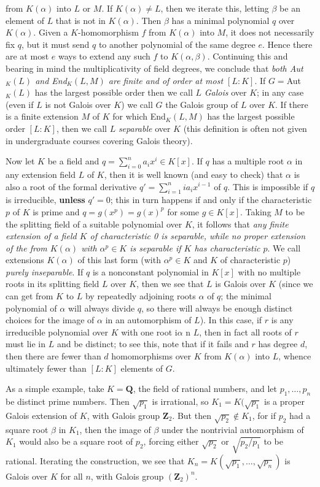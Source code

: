 \documentclass[10pt]{article}
\begin{document}
from $K(\alpha)$ into $L$ or $M$. If $K(\alpha)\ne L$, then we iterate
this, letting $\beta$ be an element of $L$ that is not in $K(\alpha)$.
Then $\beta$ has a minimal polynomial $q$ over $K(\alpha)$. Given a
$K$-homomorphism $f$ from $K(\alpha)$ into $M$, it does not necessarily
fix $q$, but it must send $q$ to another polynomial of the same degree
$e$. Hence there are at most $e$ ways to extend any such $f$ to
$K(\alpha,\beta)$. Continuing this and bearing in mind the
multiplicativity of field degrees, we conclude that {\sl both Aut$_K(L)$
  and End$_K(L,M)$ are finite and of order at most $[L:K]$}. If
$G=$Aut$_K(L)$ has the largest possible order then we call $L$ {\sl
  Galois} over $K$; in any case (even if $L$ is not Galois over $K$) we
call $G$ the Galois group of $L$ over $K$. If there is a finite
extension $M$ of $K$ for which End$_K(L,M)$ has the largest possible
order $[L:K]$, then we call $L$ {\sl separable} over $K$ (this
definition is often not given in undergraduate courses covering Galois
theory).

Now let $K$ be a field and $q=\sum_{i=0}^n a_i x^i \in K[x]$. If $q$ has
a multiple root $\alpha$ in any extension field $L$ of $K$, then it is
well known (and easy to check) that $\alpha$ is also a root of the
formal derivative $q' = \sum_{i=1}^n ia_i x^{i-1}$ of $q$. This is
impossible if $q$ is irreducible, \textbf{unless} $q' = 0$; this in turn
happens if and only if the characteristic $p$ of $K$ is prime and $q =
g(x^p) = g(x)^p$ for some $g\in K[x]$. Taking $M$ to be the splitting
field of a suitable polynomial over $K$, it follows that {\sl any finite
  extension of a field $K$ of characteristic 0 is separable, while no
  proper extension of the from $K(\alpha)$ with $\alpha^p\in K$ is
  separable if $K$ has characteristic $p$}. We call extensions
$K(\alpha)$ of this last form (with $\alpha^p\in K$ and $K$ of
characteristic $p$) {\sl purely inseparable}. If $q$ is a nonconstant
polynomial in $K[x]$ with no multiple roots in its splitting field $L$
over $K$, then we see that $L$ is Galois over $K$ (since we can get from
$K$ to $L$ by repeatedly adjoining roots $\alpha$ of $q$; the minimal
polynomial of $\alpha$ will always divide $q$, so there will always be
enough distinct choices for the image of $\alpha$ in an automorphism of
$L$). In this case, if $r$ is any irreducible polynomial over $K$ with
one root i$\alpha$ n $L$, then in fact all roots of $r$ must lie in $L$
and be distinct; to see this, note that if it fails and $r$ has degree
$d$, then there are fewer than $d$ homomorphisms over $K$ from
$K(\alpha)$ into $L$, whence ultimately fewer than $[L:K]$ elements of
$G$.

As a simple example, take $K=\mathbf Q$, the field of rational numbers,
and let $p_1,\ldots,p_n$ be distinct prime numbers. Then $\sqrt{p_1}$ is
irrational, so $K_1=K(\sqrt{p_1}$ is a proper Galois extension of $K$,
with Galois group $\mathbf Z_2$. But then $\sqrt{p_2}\notin K_1$, for if
$p_2$ had a square root $\beta$ in $K_1$, then the image of $\beta$
under the nontrivial automorphism of $K_1$ would also be a square root
of $p_2$, forcing either $\sqrt{p_2}$ or $\sqrt{p_2/p_1}$ to be
rational. Iterating the construction, we see that $K_n =
K(\sqrt{p_1},\ldots,\sqrt{p_n})$ is Galois over $K$ for all $n$, with
Galois group $(\mathbf Z_2)^n$.
\end{document}
